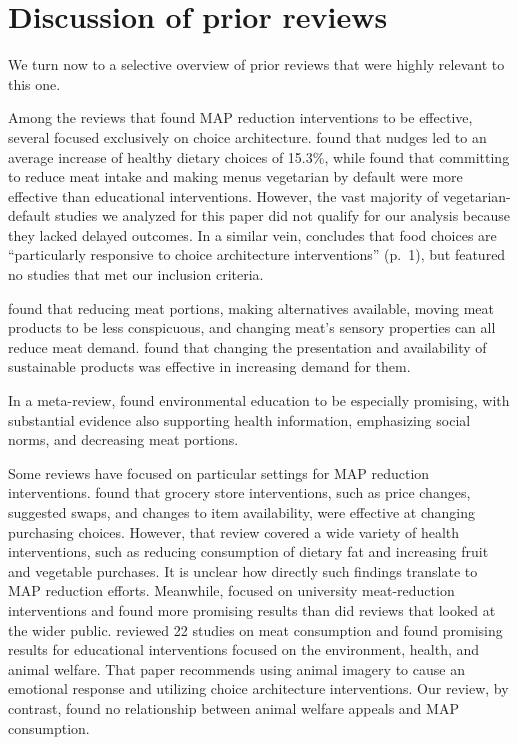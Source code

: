 \documentclass[sn-nature,referee,pdflatex]{sn-jnl}
\begin{document}
\section{Discussion of prior reviews}\label{discussion-of-prior-reviews}

We turn now to a selective overview of prior reviews that were highly
relevant to this one.

Among the reviews that found MAP reduction interventions to be
effective, several focused exclusively on choice architecture.
\citep{arno2016} found that nudges led to an average increase of healthy
dietary choices of 15.3\%, while \citep{byerly2018} found that
committing to reduce meat intake and making menus vegetarian by default
were more effective than educational interventions. However, the vast
majority of vegetarian-default studies we analyzed for this paper did
not qualify for our analysis because they lacked delayed outcomes. In a
similar vein, \citep{mertens2022} concludes that food choices are
``particularly responsive to choice architecture interventions'' (p.~1),
but featured no studies that met our inclusion criteria.

\citep{bianchi2018restructuring} found that reducing meat portions,
making alternatives available, moving meat products to be less
conspicuous, and changing meat's sensory properties can all reduce meat
demand. \citep{pandey2023} found that changing the presentation and
availability of sustainable products was effective in increasing demand
for them.

In a meta-review, \citep{grundy2022} found environmental education to be
especially promising, with substantial evidence also supporting health
information, emphasizing social norms, and decreasing meat portions.

Some reviews have focused on particular settings for MAP reduction
interventions. \citep{hartmannboyce2018} found that grocery store
interventions, such as price changes, suggested swaps, and changes to
item availability, were effective at changing purchasing choices.
However, that review covered a wide variety of health interventions,
such as reducing consumption of dietary fat and increasing fruit and
vegetable purchases. It is unclear how directly such findings translate
to MAP reduction efforts. Meanwhile, \citep{chang2023} focused on
university meat-reduction interventions and found more promising results
than did reviews that looked at the wider public. \citep{harguess2020}
reviewed 22 studies on meat consumption and found promising results for
educational interventions focused on the environment, health, and animal
welfare. That paper recommends using animal imagery to cause an
emotional response and utilizing choice architecture interventions. Our
review, by contrast, found no relationship between animal welfare
appeals and MAP consumption.
\end{document}
